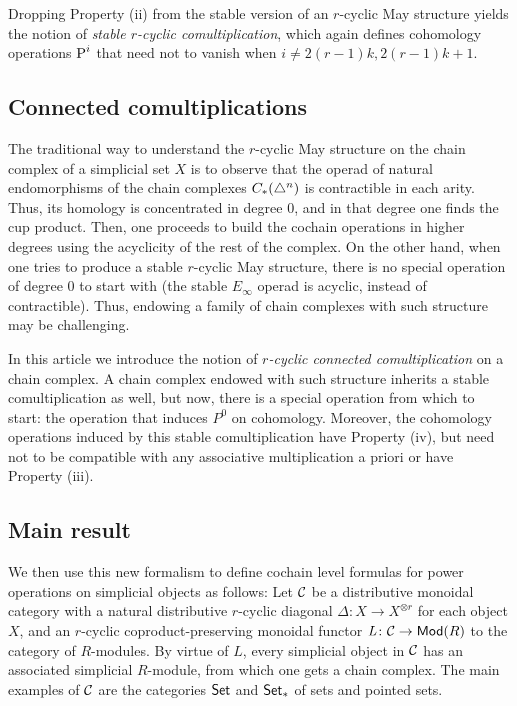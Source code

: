 Dropping Property (ii) from the stable version of an $r$-cyclic May structure yields the notion of \emph{stable $r$-cyclic comultiplication}, which again defines cohomology operations $\operatorname{P}^i$ that need not to vanish when $i \neq 2(r-1)k, 2(r-1)k+1$.

\subsection{Connected comultiplications} The traditional way to understand the $r$-cyclic May structure on the chain complex of a simplicial set $X$ is to observe that the operad of natural endomorphisms of the chain complexes $C_{*}(\triangle^n)$ is contractible in each arity. Thus, its homology is concentrated in degree $0$, and in that degree one finds the cup product. Then, one proceeds to build the cochain operations in higher degrees using the acyclicity of the rest of the complex. On the other hand, when one tries to produce a stable $r$-cyclic May structure, there is no special operation of degree $0$ to start with (the stable $E_{\infty}$ operad is acyclic, instead of contractible). Thus, endowing a family of chain complexes with such structure may be challenging.

In this article we introduce the notion of \emph{$r$-cyclic connected comultiplication} on a chain complex. A chain complex endowed with such structure inherits a stable comultiplication as well, but now, there is a special operation from which to start: the operation that induces $P^0$ on cohomology. Moreover, the cohomology operations induced by this stable comultiplication have Property (iv), but need not to be compatible with any associative multiplication a priori or have Property (iii). %


\subsection{Main result} We then use this new formalism to define cochain level formulas for power operations on simplicial objects as follows: Let $\mathcal{C}$ be a distributive monoidal category with a natural distributive $r$-cyclic diagonal $\Delta\colon X\to X^{\otimes r}$ for each object $X$, and an $r$-cyclic coproduct-preserving monoidal functor $\operatorname{{\it L}}\colon \mathcal{C}\to \mathsf{Mod}(R)$ to the category of $R$-modules. By virtue of $L$, every simplicial object in $\mathcal{C}$ has an associated simplicial $R$-module, from which one gets a chain complex. The main examples of $\mathcal{C}$ are the categories $\mathsf{Set}$ and $\mathsf{Set}_*$ of sets and pointed sets.

